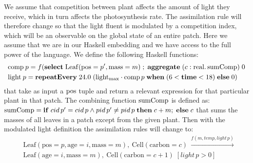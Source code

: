 We assume that competition between plant affects the amount of light they
receive, which in turn affects the photosynthesis rate. The assimilation rule
will therefore change so that the light fluent is modulated by a competition
index, which will be an observable on the global state of an entire patch. Here
we assume that we are in our Haskell embedding and we have access to the full
power of the language. We define the following Haskell functions:
\begin{align*}
& \mathrm{comp} \: p = f (\mathbf{select} \; \mathrm{Leaf}(\mathrm{pos}=p' ,
  \mathrm{mass} = m) \; ; \; \mathbf{aggregate} \; (c: \mathrm{real}. \,
  \mathrm{sumComp}) \; 0 \\
& \mathrm{light} \: p = \mathbf{repeatEvery} \; 24.0 \; (\mathrm{light_{max}
                          } \cdot \mathrm{comp} \, p \; \mathbf{when} \; (6 < \mathbf{time} < 18) \; \mathbf{else} \; \mathrm{0})
\end{align*}
that take as input a $\mathrm{pos}$ tuple and return a relevant expression for that
particular plant in that patch. The combining function $\mathrm{sumComp}$ is defined
as: $\mathrm{sumComp} = \mathbf{if}\; cid \, p' = cid \, p \land pid \, p' \neq pid \, p
\;\mathbf{then} \; c + m; \; \mathbf{else} \; c$ that sums the masses of all
leaves in a patch except from the given plant. Then with the modulated light
definition the assimilation rules will change to:
\begin{align*}
& \mathrm{Leaf}(\mathrm{pos} \!= \!p, \mathrm{age} \!= \!i, \mathrm{mass} \!= \!m), \:
                 \mathrm{Cell}(\mathrm{carbon} \!= \!c) \: \xrightarrow{f(m,
                 temp, light \, p)}  \\
&\mathrm{Leaf}(\mathrm{age} \!= \!i, \mathrm{mass} \!= \!m), \:
  \mathrm{Cell}(\mathrm{carbon} \!= \!c+1) \; [light \, p > 0]
\end{align*}

